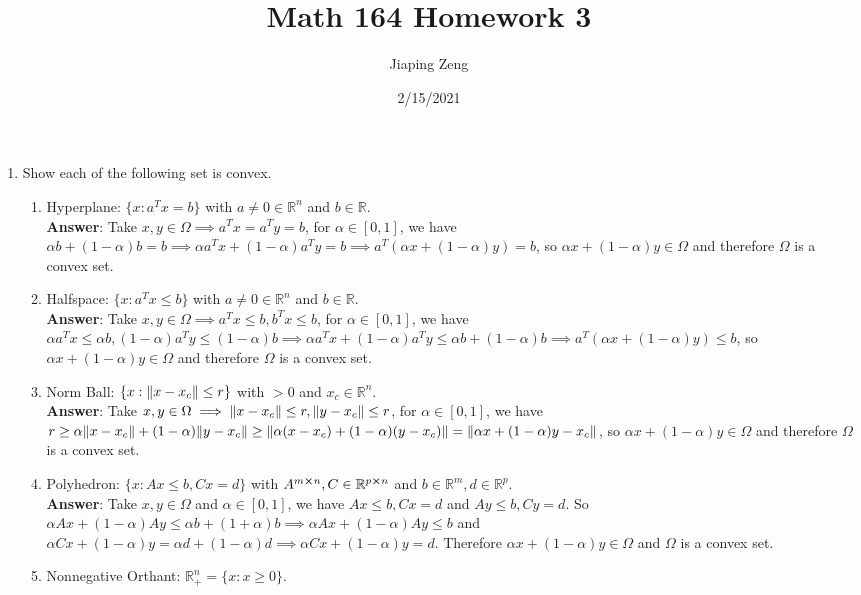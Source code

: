 \documentclass{article}
\title{Math 164 Homework 3}
\date{2/15/2021}
\author{Jiaping Zeng}
\begin{document}
\maketitle

\begin{enumerate}
      \item Show each of the following set is convex.
            \begin{enumerate}
                  \item Hyperplane: $\{x:a^Tx=b\}$ with $a\neq 0\in\mathbb{R}^n$ and $b\in\mathbb{R}$.\\
                        \textbf{Answer}: Take $x,y\in\Omega\implies a^Tx=a^Ty=b$, for $\alpha\in[0,1]$, we have $\alpha b+(1-\alpha)b=b\implies\alpha a^Tx+(1-\alpha) a^Ty=b\implies a^T(\alpha x+(1-\alpha)y)=b$, so $\alpha x+(1-\alpha)y\in\Omega$ and therefore $\Omega$ is a convex set.
                  \item Halfspace: $\{x:a^Tx\leq b\}$ with $a\neq 0\in\mathbb{R}^n$ and $b\in\mathbb{R}$.\\
                        \textbf{Answer}: Take $x,y\in\Omega\implies a^Tx\leq b,b^Tx\leq b$, for $\alpha\in[0,1]$, we have $\alpha a^Tx\leq\alpha b,(1-\alpha)a^Ty\leq (1-\alpha)b\implies\alpha a^Tx+(1-\alpha)a^Ty\leq\alpha b+(1-\alpha)b\implies a^T(\alpha x+(1-\alpha)y)\leq b$, so $\alpha x+(1-\alpha)y\in\Omega$ and therefore $\Omega$ is a convex set.
                  \item Norm Ball: $\{x:\norm{x-x_c}\leq r\}$ with $>0$ and $x_c\in\mathbb{R}^n$.\\
                        \textbf{Answer}: Take $x,y\in\Omega\implies\norm{x-x_c}\leq r,\norm{y-x_c}\leq r$, for $\alpha\in[0,1]$, we have $r\geq\alpha\norm{x-x_c}+(1-\alpha)\norm{y-x_c}\geq\norm{\alpha(x-x_c)+(1-\alpha)(y-x_c)}=\norm{\alpha x+(1-\alpha)y-x_c}$, so $\alpha x+(1-\alpha)y\in\Omega$ and therefore $\Omega$ is a convex set.
                  \item Polyhedron: $\{x:Ax\leq b,Cx=d\}$ with $A^{m\cross n},C\in\mathbb{R}^{p\cross n}$ and $b\in\mathbb{R}^m,d\in\mathbb{R}^p$.\\
                        \textbf{Answer}: Take $x,y\in\Omega$ and $\alpha\in[0,1]$, we have $Ax\leq b,Cx=d$ and $Ay\leq b,Cy=d$. So $\alpha Ax+(1-\alpha)Ay\leq\alpha b+(1+\alpha)b\implies\alpha Ax+(1-\alpha)Ay\leq b$ and $\alpha Cx+(1-\alpha)y=\alpha d+(1-\alpha)d\implies\alpha Cx+(1-\alpha)y=d$. Therefore $\alpha x+(1-\alpha)y\in\Omega$ and $\Omega$ is a convex set.
                  \item Nonnegative Orthant: $\mathbb{R}_+^n=\{x:x\geq 0\}$.\\

\end{enumerate}
\end{enumerate}
\end{document}
